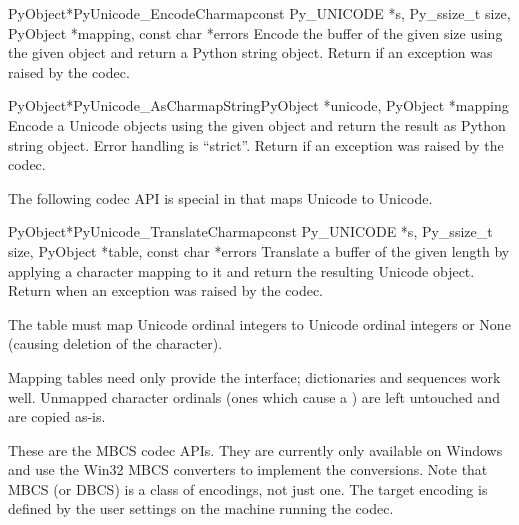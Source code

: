\begin{cfuncdesc}{PyObject*}{PyUnicode_EncodeCharmap}{const Py_UNICODE *s,
                                               Py_ssize_t size,
                                               PyObject *mapping,
                                               const char *errors}
  Encode the  buffer of the given size using the
  given  object and return a Python string object.
  Return \NULL{} if an exception was raised by the codec.
\end{cfuncdesc}

\begin{cfuncdesc}{PyObject*}{PyUnicode_AsCharmapString}{PyObject *unicode,
                                                        PyObject *mapping}
  Encode a Unicode objects using the given  object and
  return the result as Python string object.  Error handling is
  ``strict''.  Return \NULL{} if an exception was raised by the
  codec.
\end{cfuncdesc}

The following codec API is special in that maps Unicode to Unicode.

\begin{cfuncdesc}{PyObject*}{PyUnicode_TranslateCharmap}{const Py_UNICODE *s,
                                               Py_ssize_t size,
                                               PyObject *table,
                                               const char *errors}
  Translate a  buffer of the given length by
  applying a character mapping  to it and return the
  resulting Unicode object.  Return \NULL{} when an exception was
  raised by the codec.

  The  table must map Unicode ordinal integers to Unicode
  ordinal integers or None (causing deletion of the character).

  Mapping tables need only provide the 
  interface; dictionaries and sequences work well.  Unmapped character
  ordinals (ones which cause a ) are left
  untouched and are copied as-is.
\end{cfuncdesc}


These are the MBCS codec APIs. They are currently only available on
Windows and use the Win32 MBCS converters to implement the
conversions.  Note that MBCS (or DBCS) is a class of encodings, not
just one.  The target encoding is defined by the user settings on the
machine running the codec.

